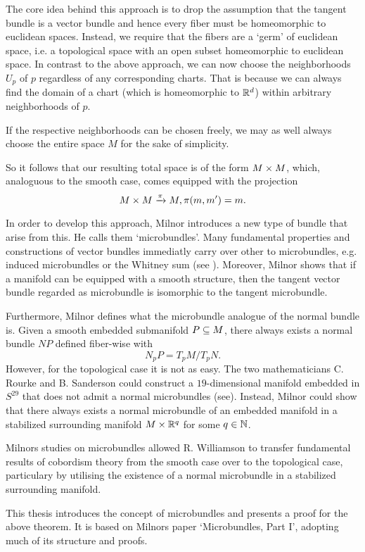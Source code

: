 \begin{myparagraph}
    The core idea behind this approach is
    to drop the assumption
    that the tangent bundle is a vector bundle and hence
    every fiber must be homeomorphic to euclidean spaces.
    Instead, we require that the fibers are a `germ' of euclidean space,
    i.e. a topological space with an open subset homeomorphic to euclidean space.
    In contrast to the above approach,
    we can now choose the neighborhoods $U_p$ of $p$ regardless of any corresponding charts.
    That is because we can always find
    the domain of a chart (which is homeomorphic to $\mathbb{R}^d$) within arbitrary neighborhoods of $p$.

    If the respective neighborhoods can be chosen freely,
    we may as well always choose the entire space $M$ for the sake of simplicity.

    So it follows that our resulting total space is of the form $M \times M$, which,
    analoguous to the smooth case, comes equipped with the projection
    \[ M \times M \xrightarrow{\pi} M, \pi(m, m') = m. \]
    
    In order to develop this approach, Milnor introduces a new type of bundle
    that arise from this.
    He calls them `microbundles'.
    Many fundamental properties
    and constructions of vector bundles immediatly carry over other to microbundles,
    e.g. induced microbundles or the Whitney sum (see ).
    Moreover, Milnor shows that if a manifold can be equipped with a smooth structure,
    then the tangent vector bundle regarded as microbundle is isomorphic to the
    tangent microbundle.

    Furthermore, Milnor defines what the microbundle analogue
    of the normal bundle is.
    Given a smooth embedded submanifold $P \subseteq{} M$,
    there always exists a normal bundle $NP$ defined fiber-wise with
    \[ N_p P = T_p M / T_p N. \]
    However, for the topological case it is not as easy.
    The two mathematicians C. Rourke and B. Sanderson could construct a $19$-dimensional manifold
    embedded in $S^{29}$ that does not admit a normal microbundles (see\cite{rourke}).
    Instead, Milnor could show that there always exists a normal microbundle
    of an embedded manifold
    in a stabilized surrounding manifold $M \times \mathbb{R}^q$ for some $q \in \mathbb{N}$. 

    Milnors studies on microbundles allowed R. Williamson
    to transfer fundamental results of cobordism theory from the smooth case
    over to the topological case, particulary by utilising the existence
    of a normal microbundle in a stabilized surrounding manifold.

    This thesis introduces the concept of microbundles and presents
    a proof for the above theorem.
    It is based on Milnors paper `Microbundles, Part I',
    adopting much of its structure and proofs.
\end{myparagraph}